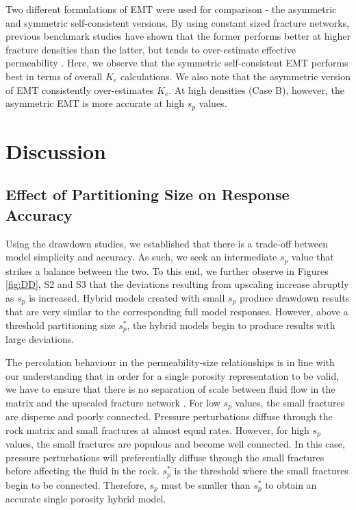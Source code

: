 \documentclass[draft]{agujournal2018}
\begin{document}
Two different formulations of EMT were used for comparison - the asymmetric and symmetric self-consistent versions. By using constant sized fracture networks, previous benchmark studies have shown that the former performs better at higher fracture densities than the latter, but tends to over-estimate effective permeability \citep{Saevik2013, Saevik2014}. Here, we observe that the symmetric self-consistent EMT performs best in terms of overall $K_e$ calculations. We also note that the asymmetric version of EMT consistently over-estimates $K_e$. At high densities (Case B), however, the asymmetric EMT is more accurate at high $s_p$ values.

\section{Discussion}
\subsection{Effect of Partitioning Size on Response Accuracy}
Using the drawdown studies, we established that there is a trade-off between model simplicity and accuracy. As such, we seek an intermediate $s_p$ value that strikes a balance between the two. To this end, we further observe in Figures \ref{fig:DD}, S2 and S3 that the deviations resulting from upscaling increase abruptly as $s_p$ is increased. Hybrid models created with small $s_p$ produce drawdown results that are very similar to the corresponding full model responses. However, above a threshold partitioning size $s_p^*$, the hybrid models begin to produce results with large deviations.

The percolation behaviour in the permeability-size relationships is in line with our understanding that in order for a single porosity representation to be valid, we have to ensure that there is no separation of scale between fluid flow in the matrix and the upscaled fracture network \citep{Matthai2004a}. For low $s_p$ values, the small fractures are disperse and poorly connected. Pressure perturbations diffuse through the rock matrix and small fractures at almost equal rates. However, for high $s_p$ values, the small fractures are populous and become well connected. In this case, pressure perturbations will preferentially diffuse through the small fractures before affecting the fluid in the rock. $s_p^*$ is the threshold where the small fractures begin to be connected. Therefore, $s_p$ must be smaller than $s_p^*$ to obtain an accurate single porosity hybrid model.
\end{document}
